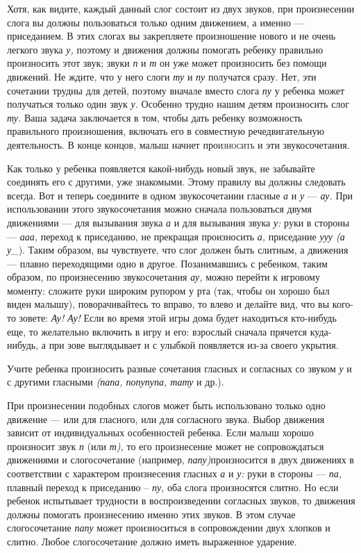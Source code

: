 \documentclass{book}
\renewcommand{\emph}[1]{\textit{#1}}
\begin{document}
Хотя, как видите, каждый данный слог состоит из двух звуков, при
произнесении слога вы должны пользоваться только одним движением, а
именно --- приседанием. В этих слогах вы закрепляете произношение нового
и не очень легкого звука \emph{у,} поэтому и движения должны помогать
ребенку правильно произносить этот звук; звуки \emph{п} и \emph{т} он
уже может произносить без помощи движений. Не ждите, что у него слоги
\emph{ту} и \emph{пу} получатся сразу. Нет, эти сочетании трудны для
детей, поэтому вначале вместо слога \emph{пу} у ребенка может получаться
только один звук \emph{у.} Особенно трудно нашим детям произносить слог
\emph{ту.} Ваша задача заключается в том, чтобы дать ребенку возможность
правильного произношения, включать его в совместную речедвигательную
деятельность. В конце концов, малыш начнет про\textsc{износить} и эти
звукосочетания.

Как только у ребенка появляется какой-нибудь новый звук, не забывайте
соединять его с другими, уже знакомыми. Этому правилу вы должны
следовать всегда. Вот и теперь соедините в одном звукосочетании гласные
\emph{а} и \emph{у} --- \emph{ау.} При использовании этого
звукосочетания можно сначала пользоваться двумя движениями --- для
вызывания звука \emph{а} и для вызывания звука \emph{у:} руки в стороны
--- \emph{ааа,} переход к приседанию, не прекращая произносить \emph{а,}
приседание \emph{ууу (а у\_}). Таким образом, вы чувствуете, что слог
должен быть слитным, а движения --- плавно переходящими одно в другое.
Позанимавшись с ребенком, таким образом, по произнесению звукосочетания
\emph{ау,} можно перейти к игровому моменту: сложите руки широким
рупором у рта (так, чтобы он хорошо был виден малышу), поворачивайтесь
то вправо, то влево и делайте вид, что вы кого-то зовете: \emph{Ау! Ау!}
Если во время этой игры дома будет находиться кто-нибудь еще, то
желательно включить в игру и его: взрослый сначала прячется куда-нибудь,
а при зове выглядывает и с улыбкой появляется из-за своего укрытия.

Учите ребенка произносить разные сочетания гласных и согласных со звуком
\emph{у} и с другими гласными \emph{(папа, попупупа, тату} и др.).

При произнесении подобных слогов может быть использовано только одно
движение --- или для гласного, или для согласного звука. Выбор движения
зависит от индивидуальных особенностей ребенка. Если малыш хорошо
произносит звук \emph{п} (или \emph{т),} то его произнесение может не
сопровождаться движениями и слогосочетание (например,
\emph{папу)}произносится в двух движениях в соответствии с характером
произнесения гласных \emph{а} и \emph{у:} руки в стороны --- \emph{па,}
плавный переход к приседанию -- \emph{пу,} оба слога произносятся
слитно. Но если ребенок испытывает трудности в воспроизведении согласных
звуков, то движения должны помогать произнесению именно этих звуков. В
этом случае слогосочетание \emph{папу} может произноситься в
сопровождении двух хлопков и слитно. Любое слогосочетание должно иметь
выраженное ударение.
\end{document}
